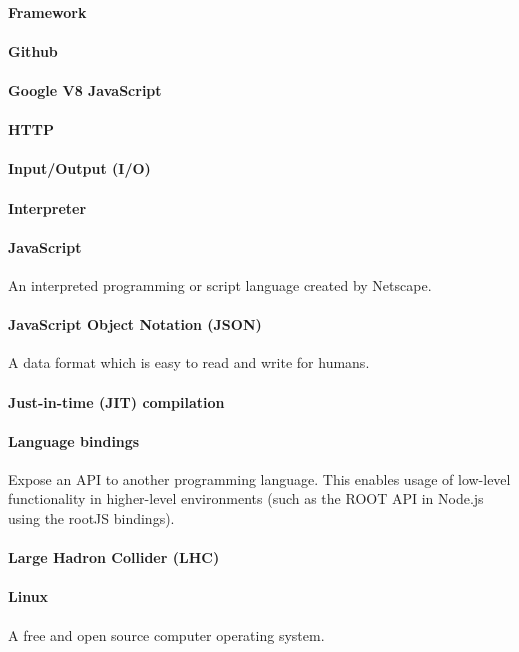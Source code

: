 \paragraph{Framework}
\paragraph{Github}
\paragraph{Google V8 JavaScript}
\paragraph{HTTP}
\paragraph{Input/Output (I/O)}
\paragraph{Interpreter}
\paragraph{JavaScript}
An interpreted programming or script language created by Netscape.
\paragraph{JavaScript Object Notation (JSON)}
A data format which is easy to read and write for humans.
\paragraph{Just-in-time (JIT) compilation}
\paragraph{Language bindings}
Expose an API to another programming language. This enables usage of low-level functionality in higher-level environments (such as the ROOT API in Node.js using the rootJS bindings).
\paragraph{Large Hadron Collider (LHC)}
\paragraph{Linux}
A free and open source computer operating system.
